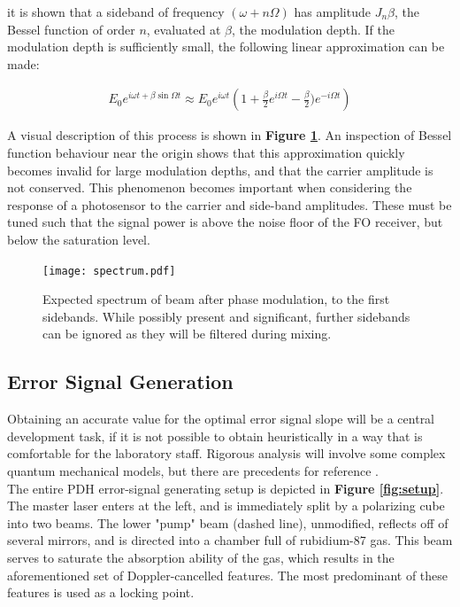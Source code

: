 it is shown that a sideband of frequency $(\omega +n\Omega)$ has amplitude
$J_n{\beta}$, the Bessel function of order $n$, evaluated at $\beta$, the
modulation depth. If the modulation depth is sufficiently small, the following
linear approximation can be made:

\begin{gather}
  E_0 e^{i \omega t + \beta \sin \Omega t}  \approx
    E_0 e^{i\omega t} \left(1 + \frac{\beta}{2}e^{i\Omega t} -
      \frac{\beta}{2}) e^{-i\Omega t} \right)
\end{gather}

A visual description of this process is shown in
\textbf{Figure \ref{fig:eom_spectrum}}.
An inspection of Bessel function behaviour near the origin shows that
this approximation quickly becomes invalid for large modulation depths, and
that the carrier amplitude is not conserved. This phenomenon becomes important
when considering the response of a photosensor to the carrier and side-band
amplitudes. These must be tuned such that the signal power is above the noise
floor of the FO receiver, but below the saturation level.

\begin{figure}
  \centering
  \texttt{[image: spectrum.pdf]}
  \caption{Expected spectrum of beam after phase modulation, to the first
  sidebands. While possibly present and significant, further sidebands can
  be ignored as they will be filtered during mixing.}
  \label{fig:eom_spectrum}
\end{figure}

\subsection{Error Signal Generation}

Obtaining an accurate value for the optimal error signal slope will be a central
development task, if it is not possible to obtain heuristically in
a way that is comfortable for the laboratory staff. Rigorous analysis will
involve some complex quantum mechanical models, but there are precedents for
reference \cite{maguire2006}. \\

The entire PDH error-signal generating setup is depicted in
\textbf{ Figure \ref{fig:setup}}.
The master laser enters at the left, and is immediately split by a
polarizing cube into two beams.  The lower "pump" beam (dashed line), unmodified,
reflects off of several mirrors, and is directed into a chamber full of
rubidium-87 gas. This beam serves to saturate the absorption ability of the gas,
which results in the aforementioned set of Doppler-cancelled features.
The most predominant of these features is used as a locking point. \\


